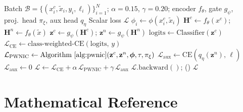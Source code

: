 \documentclass[12pt,a4paper]{report}
\newcommand{\PWNIC}{\mathcal{L}_{\mathrm{PWNIC}}}
\newcommand{\LCE}{\mathcal{L}_{\mathrm{CE}}}
\newcommand{\Laux}{\mathcal{L}_{\mathrm{aux}}}
\newcommand{\Ltot}{\mathcal{L}}
\begin{document}
\begin{algorithm}[H]
\caption{NoiseBridge Training Step}
\label{alg:train}
\begin{algorithmic}[1]
\Require Batch $\mathcal{B} = \{(x_i^c, \tilde{x}_i, y_i, \ell_i)\}_{i=1}^N$; $\alpha{=}0.15$, $\gamma{=}0.20$; encoder $f_\theta$, gate $g_\psi$, proj.\ head $\pi_\xi$, aux head $q_\eta$
\Ensure Scalar loss $\Ltot$
  \State $\phi_i \leftarrow \phi(x_i^c, \tilde{x}_i)$ 
\EndFor
\State $\mathbf{H}^c \leftarrow f_\theta(x^c)$; \quad $\mathbf{H}^n \leftarrow f_\theta(\tilde{x})$ 
\State $\mathbf{z}^c \leftarrow g_\psi(\mathbf{H}^c)$; \quad $\mathbf{z}^n \leftarrow g_\psi(\mathbf{H}^n)$ 
\State $\text{logits} \leftarrow \mathrm{Classifier}(\mathbf{z}^c)$
\State $\LCE \leftarrow \text{class-weighted-CE}(\text{logits},\, y)$ 
\State $\PWNIC \leftarrow \text{Algorithm~\ref{alg:pwnic}}(\mathbf{z}^c, \mathbf{z}^n, \boldsymbol{\phi}, \tau, \pi_\xi)$
  \State $\Laux \leftarrow \text{CE}(q_\eta(\mathbf{z}^n),\, \ell)$ 
\Else
  \State $\Laux \leftarrow 0$ 
\EndIf
\State $\Ltot \leftarrow \LCE + \alpha\,\PWNIC + \gamma\,\Laux$ 
\State $\Ltot.\text{backward}()$; \quad {}()
\State \Return $\Ltot$
\end{algorithmic}
\end{algorithm}

\chapter{Mathematical Reference}
\label{app:math}
\end{document}
